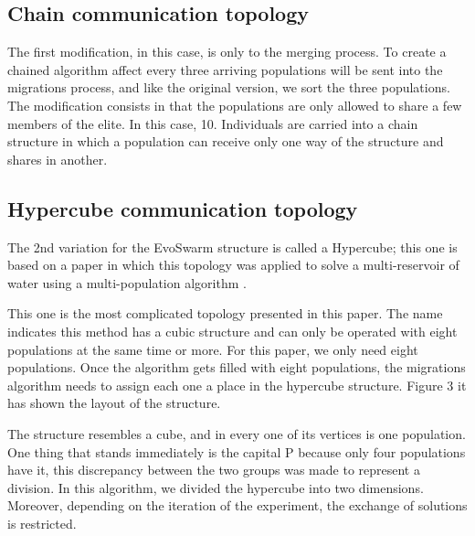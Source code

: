 \documentclass[runningheads]{llncs}
\begin{document}
\subsection{Chain communication topology}

The first modification, in this case, is only to the merging process. To create
a chained algorithm affect every three arriving populations will be sent into
the migrations process, and like the original version, we sort the three
populations. The modification consists in that the populations are only allowed
to share a few members of the elite. In this case, 10. Individuals are carried
into a chain structure in which a population can receive only one way of the
structure and shares in another.


\subsection{Hypercube communication topology}

The 2nd variation for the EvoSwarm structure is called a Hypercube; this one is
based on a paper in which this topology was applied to solve a multi-reservoir
of water using a multi-population algorithm \cite{b20}.  

This one is the most complicated topology presented in this paper. The name
indicates this method has a cubic structure and can only be operated with eight
populations at the same time or more. For this paper, we only need eight
populations. Once the algorithm gets filled with eight populations, the
migrations algorithm needs to assign each one a place in the hypercube
structure. Figure 3 it has shown the layout of the structure.


The structure resembles a cube, and in every one of its vertices is
one population. One thing that stands immediately is the capital P
because only four populations have it, this discrepancy between the
two groups was made to represent a division. In this algorithm, we
divided the hypercube into two dimensions. Moreover, depending on
the %
iteration of the experiment, the exchange of solutions is restricted.
\end{document}
